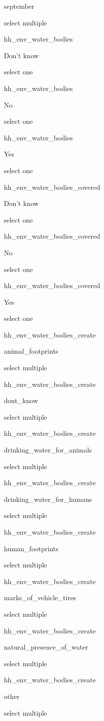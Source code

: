 \documentclass[]{article}
\begin{document}
september

select multiple

hh\_env\_water\_bodies

Don't know

select one

hh\_env\_water\_bodies

No

select one

hh\_env\_water\_bodies

Yes

select one

hh\_env\_water\_bodies\_covered

Don't know

select one

hh\_env\_water\_bodies\_covered

No

select one

hh\_env\_water\_bodies\_covered

Yes

select one

hh\_env\_water\_bodies\_create

animal\_footprints

select multiple

hh\_env\_water\_bodies\_create

dont\_know

select multiple

hh\_env\_water\_bodies\_create

drinking\_water\_for\_animals

select multiple

hh\_env\_water\_bodies\_create

drinking\_water\_for\_humans

select multiple

hh\_env\_water\_bodies\_create

human\_footprints

select multiple

hh\_env\_water\_bodies\_create

marks\_of\_vehicle\_tires

select multiple

hh\_env\_water\_bodies\_create

natural\_presence\_of\_water

select multiple

hh\_env\_water\_bodies\_create

other

select multiple
\end{document}
